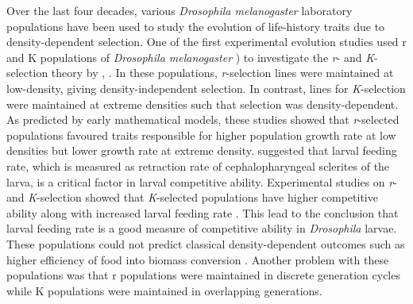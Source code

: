Over the last four decades, various \textit{Drosophila melanogaster} laboratory populations have been used to study the evolution of life-history traits due to density-dependent selection. One of the first experimental evolution studies used r and K populations of \textit{Drosophila melanogaster} \citep{muellerTradeoffRselectionKselection1981} ) to investigate the \textit{r}- and \textit{K}-selection theory by  \citet{macarthurGENERALIZEDTHEOREMSNATURAL1962}, \citet*{macarthurTheoryIslandBiogeography1967}. In these populations, \textit{r}-selection lines were maintained at low-density, giving density-independent selection. In contrast, lines for \textit{K}-selection were maintained at extreme densities such that selection was density-dependent. As predicted by early mathematical models, these studies showed that \textit{r}-selected populations favoured traits responsible for higher population growth rate at low densities but lower growth rate at extreme density. \citet{bakkerAnalysisFactorsWhich1962,burnetGeneticAnalysisLarval1977} suggested that larval feeding rate, which is measured as retraction rate of cephalopharyngeal sclerites of the larva, is a critical factor in larval competitive ability. Experimental studies on \textit{r}- and \textit{K}-selection showed that \textit{K}-selected populations have higher competitive ability along with increased larval feeding rate \citep{joshiEvolutionHigherFeeding1988}. This lead to the conclusion that larval feeding rate is a good measure of competitive ability in \textit{Drosophila} larvae. These populations could not predict classical density-dependent outcomes such as higher efficiency of food into biomass conversion \citep{muellerDensitydependentNaturalSelection1990}. Another problem with these populations was that r populations were maintained in discrete generation cycles while K populations were maintained in overlapping generations. \\\\

